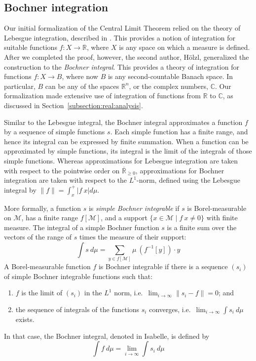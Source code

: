 \documentclass{svjour3}
\newcommand{\RR}{\mathbb{R}}
\newcommand{\CC}{\mathbb{C}}
\newcommand{\ennRR}{\overline{\mathbb{R}}_{\ge 0}}
\newcommand{\mdl}[1]{{\mathcal #1}} %
\begin{document}
\subsection{Bochner integration}
\label{subsection:bochner}

Our initial formalization of the Central Limit Theorem relied on the theory of Lebesgue integration, described in \cite{hoelzl:heller:11}. This provides a notion of integration for suitable functions $f : X \to \RR$, where $X$ is any space on which a measure is defined. After we completed the proof, however, the second author, H\"olzl, generalized the construction to the \emph{Bochner integral}. This provides a theory of integration for functions $f : X \to B$, where now $B$ is any second-countable Banach space. In particular, $B$ can be any of the spaces $\RR^n$, or the complex numbers, $\CC$. Our formalization made extensive use of integration of functions from $\RR$ to $\CC$, as discussed in Section~\ref{subsection:real:analysis}.

Similar to the Lebesgue integral, the Bochner integral approximates a function $f$ by a sequence of simple functions $s$. Each simple function has a finite range, and hence its integral can be expressed by finite summation. When a function can be approximated by simple functions, its  integral is the limit of the integrals of those simple functions. Whereas approximations for Lebesgue integration are taken with respect to the pointwise order on $\ennRR$, approximations for Bochner integration are taken with respect to the $L^1$-norm, defined using the Lebesgue integral by $\lVert f \rVert = \int_x^+ |f~x| d\mu$.

More formally, a function $s$ is \emph{simple Bochner integrable} if $s$ is Borel-measurable on $\mdl M$, has a finite range $f[\mdl M]$, and a support $\{x \in \mdl M \mid f~x \not= 0\}$ with finite measure. The integral of a simple Bochner function $s$ is a finite sum over the vectors of the range of $s$ times the measure of their support:
\[ \int s~d\mu = \sum_{ y \in f[\mdl M]} \mu~(f^{-1}[y]) \cdot y\]
A Borel-measurable function $f$ is Bochner integrable if there is a sequence $(s_i)$ of simple Bochner integrable functions such that:
\begin{enumerate}
 \item $f$ is the limit of $(s_i)$ in the $L^1$ norm, i.e.~$\lim_{i \rightarrow \infty} \lVert s_i - f \rVert = 0$; and
 \item the sequence of integrals of the functions $s_i$ converges, i.e.~$\lim_{i \rightarrow \infty} \int s_i ~d\mu$ exists. 
\end{enumerate} 
In that case, the Bochner integral, denoted  in Isabelle, is defined by
\[ \int f~d\mu = \lim_{i \rightarrow \infty} \int s_i ~d\mu \]
\end{document}
